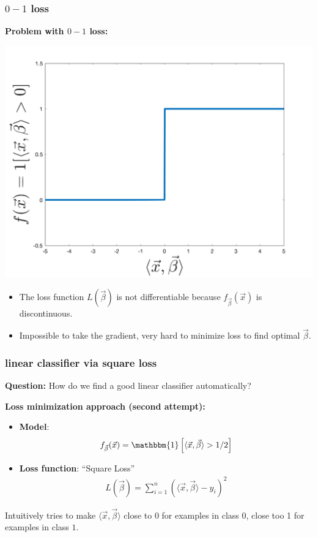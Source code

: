\documentclass[handout,compress]{beamer}
\begin{document}
\begin{frame}
	\frametitle{$0-1$ loss}
	\textbf{Problem with $0-1$ loss:}
	\vspace{-.5em}
	\begin{center}
		\includegraphics[width=.5\textwidth]{sharp_function.png}
			\vspace{-.5em}
	\end{center}
\begin{itemize}
	\item The loss function $L(\vec{\beta})$ is not differentiable because $f_{\vec{\beta}}(\vec{x})$ is discontinuous.
	\item Impossible to take the gradient, very hard to minimize loss to find optimal $\vec{\beta}$.
\end{itemize}
\end{frame}

\begin{frame}
	\frametitle{linear classifier via square loss}
	\textbf{Question:} How do we find a good linear classifier automatically?
	
	\textbf{Loss minimization approach (second attempt):}
	\begin{itemize}
		\item \textbf{Model}: 
		\begin{align*}
		f_{\vec{\beta}}(\vec{x}) = \mathbbm{1}\left[\langle \vec{x},\vec{\beta}\rangle > 1/2\right]
		\end{align*}
		\item \textbf{Loss function}: ``Square Loss''
		\begin{align*}
		L(\vec{\beta}) = \sum_{i=1}^n (\langle \vec{x},\vec{\beta}\rangle-y_i)^2
		\end{align*}
	\end{itemize}
Intuitively tries to make $\langle \vec{x},\vec{\beta}\rangle$ close to 0 for examples in class 0, close too 1 for examples in class $1$. 
\end{frame}
\end{document}
